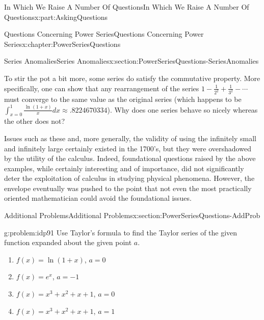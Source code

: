 \documentclass[oneside,10pt,]{book}
\numberwithin{equation}{section}
\begin{document}
\begin{partptx}{In Which We Raise A Number Of Questions}{}{In Which We Raise A Number Of Questions}{}{}{x:part:AskingQuestions}
\begin{chapterptx}{Questions Concerning Power Series}{}{Questions Concerning Power Series}{}{}{x:chapter:PowerSeriesQuestions}
\begin{sectionptx}{Series Anomalies}{}{Series Anomalies}{}{}{x:section:PowerSeriesQuestions-SeriesAnomalies}
\par
To stir the pot a bit more, some series do satisfy the commutative property. More specifically, one can show that any rearrangement of the series \(1-\frac{1}{2^2}+\frac{1}{3^2}-\cdots\) must converge to the same value as the original series (which happens to be \(\int_{x=0}^1\frac{\text{ ln } (1+x)}{x}dx\approx.8224670334\)). Why does one series behave so nicely whereas the other does not?%
\par
Issues such as these and, more generally, the validity of using the infinitely small and infinitely large certainly existed in the 1700's, but they were overshadowed by the utility of the calculus. Indeed, foundational questions raised by the above examples, while certainly interesting and of importance, did not significantly deter the exploitation of calculus in studying physical phenomena. However, the envelope eventually was pushed to the point that not even the most practically oriented mathematician could avoid the foundational issues.%
\end{sectionptx}
%
%
\typeout{************************************************}
\typeout{************************************************}
%
\begin{sectionptx}{Additional Problems}{}{Additional Problems}{}{}{x:section:PowerSeriesQuestions-AddProb}
\begin{problem}{}{g:problem:idp91}%
Use Taylor's formula to find the Taylor series of the given function expanded about the given point \(a\).%
\begin{enumerate}[font=\bfseries,label=(\alph*),ref=\alph*]
\item{}\(f(x)=\ln\left(1+x\right)\), \(a=0\)%
\item{}\(f(x)=e^x\), \(a=-1\)%
\item{}\(f(x)=x^3+x^2+x+1\), \(a=0\)%
\item{}\(f(x)=x^3+x^2+x+1\), \(a=1\)%
\end{enumerate}
\end{problem}
\end{sectionptx}
\end{chapterptx}
\end{partptx}
%
%
\typeout{************************************************}
\typeout{************************************************}
%
\end{document}
